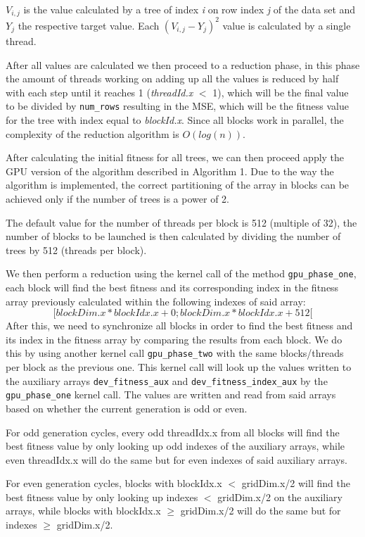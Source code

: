 \documentclass[runningheads]{llncs}
\begin{document}
$V_{i,j}$ is the value calculated by a tree of index \textit{i} on row index \textit{j} of the data set and $Y_{j}$ the respective target value. Each $(V_{i,j} - Y_{j})^{2}$ value is calculated by a single thread.

After all values are calculated we then proceed to a reduction phase, in this phase the amount of threads working on adding up all the values is reduced by half with each step until it reaches 1 (\textit{threadId.x} $<$ 1), which will be the final value to be divided by \texttt{num\_rows} resulting in the MSE, which will be the fitness value for the tree with index equal to \textit{blockId.x}. Since all blocks work in parallel, the complexity of the reduction algorithm is $O(log(n))$.

After calculating the initial fitness for all trees, we can then proceed apply the GPU version of the algorithm described in Algorithm 1. Due to the way the algorithm is implemented, the correct partitioning of the array in blocks can be achieved only if the number of trees is a power of 2.

The default value for the number of threads per block is 512 (multiple of 32), the number of blocks to be launched is then calculated by dividing the number of trees by 512 (threads per block).

We then perform a reduction using the kernel call of the method \texttt{gpu\_phase\_one}, each block will find the best fitness and its corresponding index in the fitness array previously calculated within the following indexes of said array: $$[\textit{blockDim.x} * \textit{blockIdx.x} + 0; \textit{blockDim.x} * \textit{blockIdx.x} + 512[$$
After this, we need to synchronize all blocks in order to find the best fitness and its index in the fitness array by comparing the results from each block. We do this by using another kernel call \texttt{gpu\_phase\_two} with the same blocks/threads per block as the previous one. This kernel call will look up the values written to the auxiliary arrays \texttt{dev\_fitness\_aux} and \texttt{dev\_fitness\_index\_aux} by the \texttt{gpu\_phase\_one} kernel call. The values are written and read from said arrays based on whether the current generation is odd or even.

For odd generation cycles, every odd threadIdx.x from all blocks will find the best fitness value by only looking up odd indexes of the auxiliary arrays, while even threadIdx.x will do the same but for even indexes of said auxiliary arrays.

For even generation cycles, blocks with blockIdx.x $<$ gridDim.x/2 will find the best fitness value by only looking up indexes $<$ gridDim.x/2 on the auxiliary arrays, while blocks with blockIdx.x $\geq$ gridDim.x/2 will do the same but for indexes $\geq$ gridDim.x/2.
\end{document}
